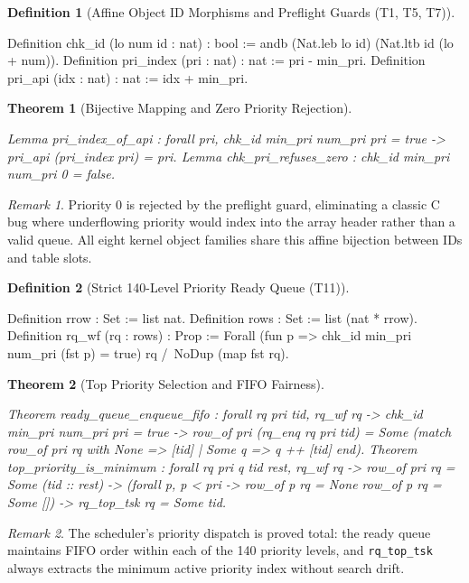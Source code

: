 \documentclass[10pt,journal,compsoc,twocolumn]{article}
\newtheorem{theorem}{Theorem}[section]
\theoremstyle{definition}
\newtheorem{definition}{Definition}[section]
\theoremstyle{remark}
\newtheorem{remark}{Remark}[section]
\theoremstyle{plain}
\newcommand{\ctr}[1]{\texttt{#1}}
\begin{document}
\begin{definition}[Affine Object ID Morphisms and Preflight Guards (T1, T5, T7)]
\begin{coc}
Definition chk_id (lo num id : nat) : bool :=
  andb (Nat.leb lo id) (Nat.ltb id (lo + num)).
Definition pri_index (pri : nat) : nat := pri - min_pri.
Definition pri_api (idx : nat) : nat := idx + min_pri.
\end{coc}\end{definition}
\begin{theorem}[Bijective Mapping and Zero Priority Rejection]
\begin{coc}
Lemma pri_index_of_api : forall pri, chk_id min_pri num_pri pri = true ->
  pri_api (pri_index pri) = pri.
Lemma chk_pri_refuses_zero : chk_id min_pri num_pri 0 = false.
\end{coc}\end{theorem}
\begin{remark}
Priority 0 is rejected by the preflight guard, eliminating a classic C bug where
underflowing priority would index into the array header rather than a valid queue.
All eight kernel object families share this affine bijection between IDs and table slots.
\end{remark}

\begin{definition}[Strict 140-Level Priority Ready Queue (T11)]
\begin{coc}
Definition rrow : Set := list nat.
Definition rows : Set := list (nat * rrow).
Definition rq_wf (rq : rows) : Prop :=
  Forall (fun p => chk_id min_pri num_pri (fst p) = true) rq /\
  NoDup (map fst rq).
\end{coc}\end{definition}
\begin{theorem}[Top Priority Selection and FIFO Fairness]
\begin{coc}
Theorem ready_queue_enqueue_fifo : forall rq pri tid,
  rq_wf rq -> chk_id min_pri num_pri pri = true ->
  row_of pri (rq_enq rq pri tid) =
    Some (match row_of pri rq with None => [tid] | Some q => q ++ [tid] end).
Theorem top_priority_is_minimum : forall rq pri q tid rest,
  rq_wf rq -> row_of pri rq = Some (tid :: rest) ->
  (forall p, p < pri -> row_of p rq = None \/ row_of p rq = Some []) ->
  rq_top_tsk rq = Some tid.
\end{coc}\end{theorem}
\begin{remark}
The scheduler's priority dispatch is proved total: the ready queue maintains
FIFO order within each of the 140 priority levels, and \ctr{rq\_top\_tsk} always
extracts the minimum active priority index without search drift.
\end{remark}
\end{document}
